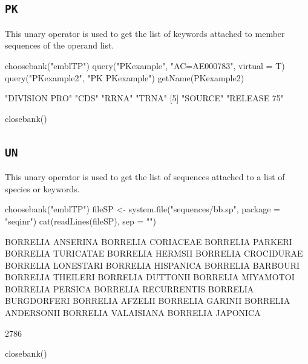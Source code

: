 \documentclass{article}
\begin{document}
\subsection{\texttt{PK}}

This unary operator is used to get the list of keywords attached to member sequences 
of the operand list.

\begin{Schunk}
\begin{Sinput}
 choosebank("emblTP")
 query("PKexample", "AC=AE000783", virtual = T)
 query("PKexample2", "PK PKexample")
 getName(PKexample2)
\end{Sinput}
\begin{Soutput}
[1] "DIVISION PRO" "CDS"          "RRNA"         "TRNA"        
[5] "SOURCE"       "RELEASE 75"  
\end{Soutput}
\begin{Sinput}
 closebank()
\end{Sinput}
\end{Schunk}

\subsection{\texttt{UN}}

This unary operator is used to get the list of sequences attached to a list
of species or keywords.

\begin{Schunk}
\begin{Sinput}
 choosebank("emblTP")
 fileSP <- system.file("sequences/bb.sp", package = "seqinr")
 cat(readLines(fileSP), sep = "\n")
\end{Sinput}
\begin{Soutput}
BORRELIA ANSERINA
BORRELIA CORIACEAE
BORRELIA PARKERI
BORRELIA TURICATAE
BORRELIA HERMSII
BORRELIA CROCIDURAE
BORRELIA LONESTARI
BORRELIA HISPANICA
BORRELIA BARBOURI
BORRELIA THEILERI
BORRELIA DUTTONII
BORRELIA MIYAMOTOI
BORRELIA PERSICA
BORRELIA RECURRENTIS
BORRELIA BURGDORFERI
BORRELIA AFZELII
BORRELIA GARINII
BORRELIA ANDERSONII
BORRELIA VALAISIANA
BORRELIA JAPONICA
\end{Soutput}
\begin{Soutput}
[1] 2786
\end{Soutput}
\begin{Sinput}
 closebank()
\end{Sinput}
\end{Schunk}
\end{document}
